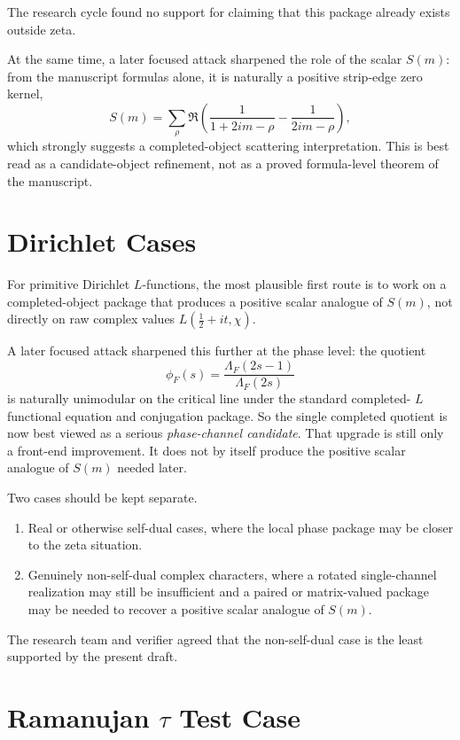 \documentclass[11pt]{article}
\begin{document}
The research cycle found no support for claiming that this package already
exists outside zeta.

At the same time, a later focused attack sharpened the role of the scalar
\(S(m)\): from the manuscript formulas alone, it is naturally a positive
strip-edge zero kernel,
\[
S(m)=\sum_\rho \Re\left(\frac{1}{1+2im-\rho}-\frac{1}{2im-\rho}\right),
\]
which strongly suggests a completed-object scattering interpretation. This is
best read as a candidate-object refinement, not as a proved formula-level
theorem of the manuscript.

\section{Dirichlet Cases}

For primitive Dirichlet \(L\)-functions, the most plausible first route is to
work on a completed-object package that produces a positive scalar analogue of
\(S(m)\), not directly on raw complex values \(L(\tfrac12+it,\chi)\).

A later focused attack sharpened this further at the phase level: the quotient
\[
\phi_F(s)=\frac{\Lambda_F(2s-1)}{\Lambda_F(2s)}
\]
is naturally unimodular on the critical line under the standard completed-
\(L\) functional equation and conjugation package. So the single completed
quotient is now best viewed as a serious \emph{phase-channel candidate}. That
upgrade is still only a front-end improvement. It does not by itself produce
the positive scalar analogue of \(S(m)\) needed later.

Two cases should be kept separate.

\begin{enumerate}
\item Real or otherwise self-dual cases, where the local phase package may be
closer to the zeta situation.
\item Genuinely non-self-dual complex characters, where a rotated single-channel
realization may still be insufficient and a paired or matrix-valued package may
be needed to recover a positive scalar analogue of \(S(m)\).
\end{enumerate}

The research team and verifier agreed that the non-self-dual case is the least
supported by the present draft.

\section{Ramanujan \texorpdfstring{$\tau$}{tau} Test Case}
\end{document}
